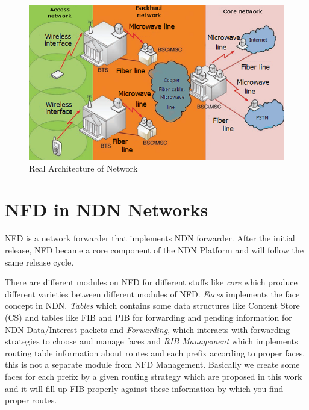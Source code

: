 \begin{figure}[H]

\begin{center}

\includegraphics[scale = 0.35]{Pictures/network.png}

\caption{Real Architecture of Network} \label{network} 

\end{center}

\end{figure}



\section{NFD in NDN Networks}
NFD is a network forwarder that implements NDN forwarder. After the initial release, NFD became a core component of the NDN Platform and will follow the same release cycle. 

There are different modules on NFD for different stuffs like \textit{core} which produce different varieties between different modules of NFD. \textit{Faces} implements the face concept in NDN. \textit{Tables} which contains some data structures like Content Store (CS) and tables like FIB and PIB for forwarding and pending information for NDN Data/Interest packets and \textit{Forwarding}, which interacts with forwarding strategies to choose and manage faces and \textit{RIB Management} which implements routing table information about routes and each prefix according to proper faces. this is not a separate module from NFD Management. Basically we create some faces for each prefix by a given routing strategy which are proposed in this work and it will fill up FIB properly against these information by which you find proper routes.


